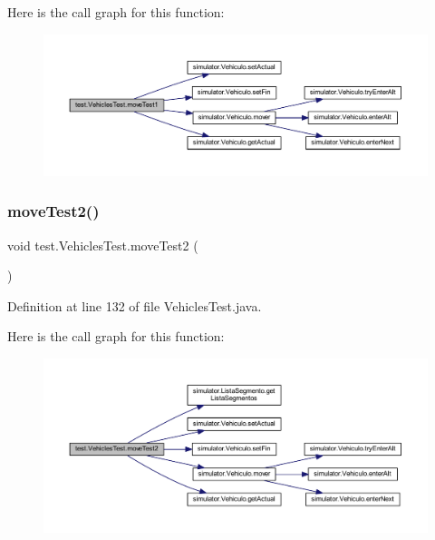 Here is the call graph for this function\+:\nopagebreak
\begin{figure}[H]
\begin{center}
\leavevmode
\includegraphics[width=350pt]{classtest_1_1_vehicles_test_a706455718c34d3c7bc6a0cb2917f2ebc_cgraph}
\end{center}
\end{figure}
\mbox{\label{classtest_1_1_vehicles_test_a300544e27feeaa4f6dad6d48f45720e9}} 
\subsubsection{\texorpdfstring{move\+Test2()}{moveTest2()}}
{\footnotesize\ttfamily void test.\+Vehicles\+Test.\+move\+Test2 (\begin{DoxyParamCaption}{ }\end{DoxyParamCaption})}



Definition at line 132 of file Vehicles\+Test.\+java.

Here is the call graph for this function\+:\nopagebreak
\begin{figure}[H]
\begin{center}
\leavevmode
\includegraphics[width=350pt]{classtest_1_1_vehicles_test_a300544e27feeaa4f6dad6d48f45720e9_cgraph}
\end{center}
\end{figure}
\mbox{\label{classtest_1_1_vehicles_test_ac6267ff4e71ba311e03c25de20196e65}} 
